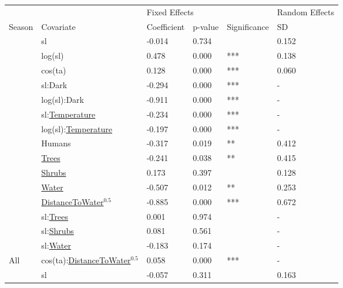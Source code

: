 
\begin{tabular}[t]{llllll}
\toprule
\multicolumn{1}{l}{} & \multicolumn{1}{l}{} & \multicolumn{3}{l}{Fixed Effects} & \multicolumn{1}{l}{Random Effects} \\
\cmidrule(l{3pt}r{3pt}){3-5} \cmidrule(l{3pt}r{3pt}){6-6}
Season & Covariate & Coefficient & p-value & Significance & SD\\
\midrule
 & sl & -0.014 & 0.734 &  & 0.152\\

 & log(sl) & 0.478 & 0.000 & *** & 0.138\\

 & cos(ta) & 0.128 & 0.000 & *** & 0.060\\

 & sl:Dark & -0.294 & 0.000 & *** & -\\

 & log(sl):Dark & -0.911 & 0.000 & *** & -\\

 & sl:\underline{Temperature} & -0.234 & 0.000 & *** & -\\

 & log(sl):\underline{Temperature} & -0.197 & 0.000 & *** & -\\

 & Humans & -0.317 & 0.019 & ** & 0.412\\

 & \underline{Trees} & -0.241 & 0.038 & ** & 0.415\\

 & \underline{Shrubs} & 0.173 & 0.397 &  & 0.128\\

 & \underline{Water} & -0.507 & 0.012 & ** & 0.253\\

 & \underline{DistanceToWater}$^{0.5}$ & -0.885 & 0.000 & *** & 0.672\\

 & sl:\underline{Trees} & 0.001 & 0.974 &  & -\\

 & sl:\underline{Shrubs} & 0.081 & 0.561 &  & -\\

 & sl:\underline{Water} & -0.183 & 0.174 &  & -\\

\multirow{-16}{*}{\raggedright\arraybackslash All} & cos(ta):\underline{DistanceToWater}$^{0.5}$ & 0.058 & 0.000 & *** & -\\
\cmidrule{1-6}
 & sl & -0.057 & 0.311 &  & 0.163\\


\end{tabular}
